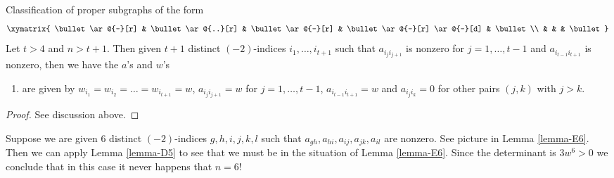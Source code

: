 \begin{lemma}
\label{lemma-Dn}
Classification of proper subgraphs of the form
$$
\xymatrix{
\bullet \ar@{-}[r] & \bullet \ar@{..}[r] & \bullet \ar@{-}[r] &
\bullet \ar@{-}[r] \ar@{-}[d] & \bullet \\
& & & \bullet
}
$$
Let $t > 4$ and $n > t + 1$. Then given $t + 1$ distinct
$(-2)$-indices $i_1, \ldots, i_{t + 1}$ such that $a_{i_ji_{j + 1}}$
is nonzero for $j = 1, \ldots, t - 1$ and $a_{i_{t - 1}i_{t + 1}}$
is nonzero, then we have the $a$'s and $w$'s
\begin{enumerate}
\item
\label{item-Dn}
are given by $w_{i_1} = w_{i_2} = \ldots = w_{i_{t + 1}} = w$,
$a_{i_ji_{j + 1}} = w$ for $j = 1, \ldots, t - 1$,
$a_{i_{t - 1}i_{t + 1}} = w$ and $a_{i_ji_k} = 0$ for other
pairs $(j, k)$ with $j > k$.
\end{enumerate}
\end{lemma}

\begin{proof}
See discussion above.
\end{proof}

\noindent
Suppose we are given $6$ distinct $(-2)$-indices $g, h, i, j, k, l$
such that $a_{gh}, a_{hi}, a_{ij}, a_{jk}, a_{il}$ are nonzero.
See picture in Lemma \ref{lemma-E6}. Then we can apply
Lemma \ref{lemma-D5} to see that we must be in the situation
of Lemma \ref{lemma-E6}. Since the determinant is $3w^6 > 0$
we conclude that in this case it never happens that $n = 6$!

